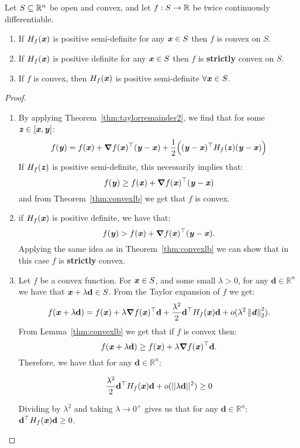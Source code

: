 \begin{theorem}
Let $S \subseteq \mathbb{R}^n$ be open and convex, and let $f:S \to \mathbb{R}$ be twice continuously differentiable.
\begin{enumerate}
\item If $H_{f}(\boldsymbol{\mathit{x}})$ is positive semi-definite for any $\boldsymbol{\mathit{x}} \in S$ then $f$ is convex on $S$.
\item If $H_{f}(\boldsymbol{\mathit{x}})$ is positive definite for any $\boldsymbol{\mathit{x}} \in S$ then $f$ is \textbf{strictly} convex on $S$.
\item If $f$ is convex, then $H_{f}(\boldsymbol{\mathit{x}})$ is positive semi-definite $\forall \boldsymbol{\mathit{x}} \in S$.
\end{enumerate}
\end{theorem}

\begin{proof}
\hspace{0.1in}\newline
\begin{enumerate}
\item By applying Theorem~\ref{thm:taylorremainder2}, we find that for some $\boldsymbol{\mathit{z}} \in [\boldsymbol{\mathit{x}},\boldsymbol{\mathit{y}}]$:
%
$$f(\boldsymbol{\mathit{y}}) = f(\boldsymbol{\mathit{x}}) + \boldsymbol{\nabla} f(\boldsymbol{\mathit{x}})^\top (\boldsymbol{\mathit{y}} - \boldsymbol{\mathit{x}}) + \frac{1}{2} \Big ( (\boldsymbol{\mathit{y}} - \boldsymbol{\mathit{x}})^\top H_{f}(\boldsymbol{\mathit{z}}) (\boldsymbol{\mathit{y}} - \boldsymbol{\mathit{x}})   \Big )$$
%
If $H_{f}(\boldsymbol{\mathit{z}})$ is positive semi-definite, this necessarily implies that:
%
$$f(\boldsymbol{\mathit{y}}) \geq f(\boldsymbol{\mathit{x}}) + \boldsymbol{\nabla} f(\boldsymbol{\mathit{x}})^\top (\boldsymbol{\mathit{y}} - \boldsymbol{\mathit{x}})$$
%
and from Theorem~\ref{thm:convexlb} we get that $f$ is convex.
%
\item if $H_{f}(\boldsymbol{\mathit{x}})$ is positive definite, we have that:
%
$$f(\boldsymbol{\mathit{y}}) > f(\boldsymbol{\mathit{x}}) + \boldsymbol{\nabla} f(\boldsymbol{\mathit{x}})^\top (\boldsymbol{\mathit{y}} - \boldsymbol{\mathit{x}}).$$
%
Applying the same idea as in Theorem~\ref{thm:convexlb} we can show that in this case $f$ is \textbf{strictly} convex.

\item Let $f$ be a convex function.  For $\boldsymbol{\mathit{x}} \in S$, and some small $\lambda >0$, for any $\mathbf{d} \in \mathbb{R}^n$ we have that $\boldsymbol{\mathit{x}} + \lambda \mathbf{d} \in S$.  From the Taylor expansion of $f$ we get:
%
$$
f(\boldsymbol{\mathit{x}}+\lambda \mathbf{d}) = f(\boldsymbol{\mathit{x}}) + \lambda \boldsymbol{\nabla} f(\boldsymbol{\mathit{x}})^\top\mathbf{d}
+ \frac{\lambda^2}{2} \mathbf{d}^\top H_{f}(\boldsymbol{\mathit{x}})  \mathbf{d} +
o(\lambda^2 \left\| \boldsymbol{\mathit{d}} \right\|_2^2)
.
$$
%
From Lemma~\ref{thm:convexlb} we get that if $f$ is convex then:
%
$$f(\boldsymbol{\mathit{x}}+\lambda\mathbf{d}) \geq f(\boldsymbol{\mathit{x}}) + \lambda \boldsymbol{\nabla} f(\boldsymbol{\mathit{x}})^\top \mathbf{d}.$$
%
Therefore, we have that for any $\mathbf{d} \in \mathbb{R}^{n}$:

$$\frac{\lambda^2}{2} \mathbf{d}^\top H_{f}(\boldsymbol{\mathit{x}})  \mathbf{d} + o(|| \lambda \mathbf{d}||^2) \geq 0$$

Dividing by $\lambda^2$ and taking $\lambda \to 0^+$ gives us that for any $\mathbf{d} \in \mathbb{R}^n$: $\mathbf{d}^\top H_{f}(\boldsymbol{\mathit{x}})  \mathbf{d} \geq 0$.\qedhere
\end{enumerate}
\end{proof}

